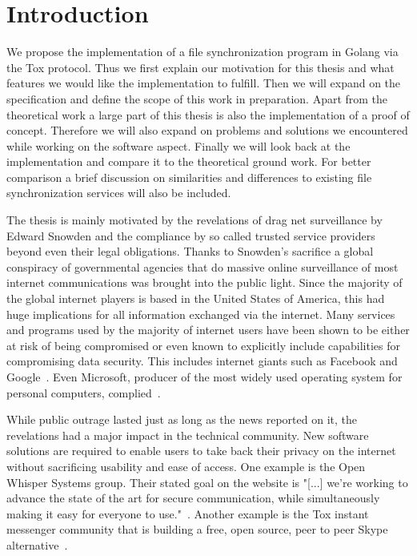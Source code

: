\chapter{Introduction}
\label{chap:Introduction}

We propose the implementation of a file synchronization program in Golang via the Tox protocol.
Thus we first explain our motivation for this thesis and what features we would like the implementation to fulfill.
Then we will expand on the specification and define the scope of this work in preparation.
Apart from the theoretical work a large part of this thesis is also the implementation of a proof of concept.
Therefore we will also expand on problems and solutions we encountered while working on the software aspect.
Finally we will look back at the implementation and compare it to the theoretical ground work.
For better comparison a brief discussion on similarities and differences to existing file synchronization services will also be included.

\label{sec:Motivation} %

The thesis is mainly motivated by the revelations of drag net surveillance by Edward Snowden and the compliance by so called trusted service providers beyond even their legal obligations.
Thanks to Snowden's sacrifice a global conspiracy of governmental agencies that do massive online surveillance of most internet communications was brought into the public light.
Since the majority of the global internet players is based in the United States of America, this had huge implications for all information exchanged via the internet.
Many services and programs used by the majority of internet users have been shown to be either at risk of being compromised or even known to explicitly include capabilities for compromising data security.
This includes internet giants such as Facebook and Google~\cite{web:site:tg:internet_giants}.
Even Microsoft, producer of the most widely used operating system for personal computers, complied~\cite{web:site:tg:microsoft}.

While public outrage lasted just as long as the news reported on it, the revelations had a major impact in the technical community.
New software solutions are required to enable users to take back their privacy on the internet without sacrificing usability and ease of access.
One example is the Open Whisper Systems group.
Their stated goal on the website is "[...] we're working to advance the state of the art for secure communication, while simultaneously making it easy for everyone to use."~\cite{web:site:whispersystems}.
Another example is the Tox instant messenger community that is building a free, open source, peer to peer Skype alternative~\cite{web:site:tox}.

